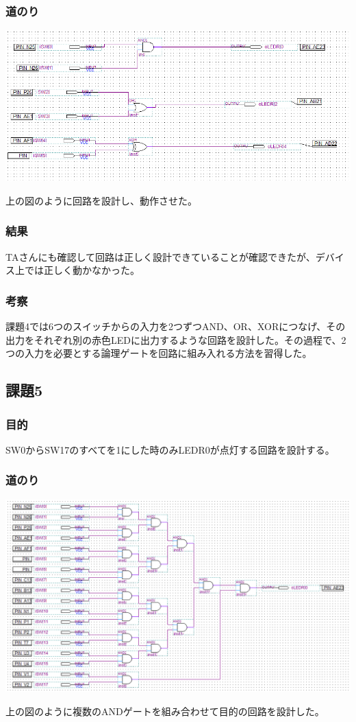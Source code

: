 \documentclass[a4paper]{jarticle}
\begin{document}
\subsubsection{道のり}
\begin{center}
	\includegraphics[width=15cm]{work4.PNG}
\end{center}
上の図のように回路を設計し、動作させた。
\subsubsection{結果}
TAさんにも確認して回路は正しく設計できていることが確認できたが、デバイス上では正しく動かなかった。
\subsubsection{考察}
課題4では6つのスイッチからの入力を2つずつAND、OR、XORにつなげ、その出力をそれぞれ別の赤色LEDに出力するような回路を設計した。その過程で、2つの入力を必要とする論理ゲートを回路に組み入れる方法を習得した。
\subsection{課題5}
\subsubsection{目的}
SW0からSW17のすべてを1にした時のみLEDR0が点灯する回路を設計する。
\subsubsection{道のり}
\begin{center}
	\includegraphics[width=15cm]{work5.PNG}
\end{center}
上の図のように複数のANDゲートを組み合わせて目的の回路を設計した。
\end{document}
